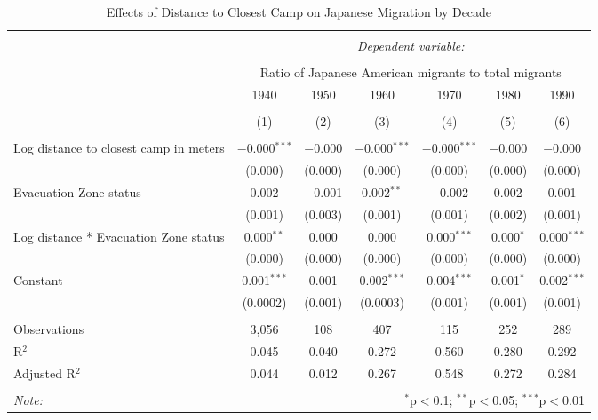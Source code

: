 
\begin{table}[!htbp] \centering 
  \caption{Effects of Distance to Closest Camp on Japanese Migration by Decade} 
  \label{} 
\begin{tabular}{@{\extracolsep{5pt}}lcccccc} 
\\[-1.8ex]\hline 
\hline \\[-1.8ex] 
 & \multicolumn{6}{c}{\textit{Dependent variable:}} \\ 
\cline{2-7} 
\\[-1.8ex] & \multicolumn{6}{c}{Ratio of Japanese American migrants to total migrants} \\ 
 & 1940 & 1950 & 1960 & 1970 & 1980 & 1990 \\ 
\\[-1.8ex] & (1) & (2) & (3) & (4) & (5) & (6)\\ 
\hline \\[-1.8ex] 
 Log distance to closest camp in meters & $-$0.000$^{***}$ & $-$0.000 & $-$0.000$^{***}$ & $-$0.000$^{***}$ & $-$0.000 & $-$0.000 \\ 
  & (0.000) & (0.000) & (0.000) & (0.000) & (0.000) & (0.000) \\ 
  Evacuation Zone status & 0.002 & $-$0.001 & 0.002$^{**}$ & $-$0.002 & 0.002 & 0.001 \\ 
  & (0.001) & (0.003) & (0.001) & (0.001) & (0.002) & (0.001) \\ 
  Log distance * Evacuation Zone status & 0.000$^{**}$ & 0.000 & 0.000 & 0.000$^{***}$ & 0.000$^{*}$ & 0.000$^{***}$ \\ 
  & (0.000) & (0.000) & (0.000) & (0.000) & (0.000) & (0.000) \\ 
  Constant & 0.001$^{***}$ & 0.001 & 0.002$^{***}$ & 0.004$^{***}$ & 0.001$^{*}$ & 0.002$^{***}$ \\ 
  & (0.0002) & (0.001) & (0.0003) & (0.001) & (0.001) & (0.001) \\ 
 \hline \\[-1.8ex] 
Observations & 3,056 & 108 & 407 & 115 & 252 & 289 \\ 
R$^{2}$ & 0.045 & 0.040 & 0.272 & 0.560 & 0.280 & 0.292 \\ 
Adjusted R$^{2}$ & 0.044 & 0.012 & 0.267 & 0.548 & 0.272 & 0.284 \\ 
\hline 
\hline \\[-1.8ex] 
\textit{Note:}  & \multicolumn{6}{r}{$^{*}$p$<$0.1; $^{**}$p$<$0.05; $^{***}$p$<$0.01} \\ 
\end{tabular} 
\end{table} 
